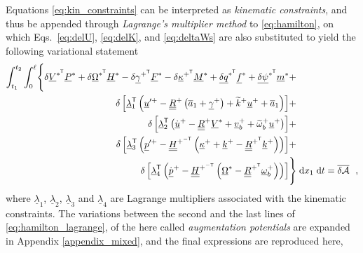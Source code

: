 \documentclass[12pt,a4paper,oneside,english]{abntex2} %
\newcommand{\vect}[1]{\underline{#1}}
\newcommand{\uvec}[1]{\overline{#1}}
\def\tens#1{\underline{\underline{#1}}}
\def\til#1{\widetilde{#1}}
\def\lb{\left[}
\def\rb{\right]}
\def\lp{\left(}
\def\rp{\right)}
\def\T{\mathsf{T}}
\def\A{\mathcal{A}}
\def\xo{x_1}
\def\aone{\uvec{a}_1}
\def\R{\tens{R}}
\def\Rp{\R^+}
\def\RpT{\R^{+^\T}}
\def\u{\vect{u}}
\def\uplus{\u^{+}}
\def\updot{\dot{\u}^{+}}
\def\upprime{\u^{\prime+}}
\def\vb{\vect{v}_b}
\def\vbplus{\vb^{+}}
\def\om{\vect{\omega}_b}
\def\omp{\om^{+}}
\def\omtil{\til{\omega}_b}
\def\omtilp{\omtil^{+}}
\def\gam{\vect{\gamma}}
\def\gamp{\gam^{+}}
\def\gampT{\gam^{+^\T}}
\def\kap{\vect{\kappa}}
\def\kapp{\kap^{+}}
\def\kappT{\kap^{+^\T}}
\def\k{\vect{k}}
\def\kp{\k^{+}}
\def\ktil{\til{k}}
\def\ktilp{\ktil^{+}}
\def\V{\vect{V}}
\def\Vs{\V^{*}}
\def\VsT{\V^{*^\T}}
\def\Om{\vect{\Omega}}
\def\Oms{\Om^{*}}
\def\OmsT{\Om^{*^\T}}
\def\P{\vect{P}}
\def\Ps{\P^*}
\def\Hv{\vect{H}}
\def\Hvs{\Hv^*}
\def\H{\tens{H}}
\def\HpmT{\H^{+^{-\T}}}
\def\p{\vect{p}}
\def\pdot{\dot{\p}}
\def\ppdot{\pdot^{+}}
\def\ppprime{\p^{\prime{+}}}
\def\F{\vect{F}}
\def\Fs{\F^*}
\def\M{\vect{M}}
\def\Ms{\M^*}
\def\f{\vect{f}}
\def\fs{\f^*}
\def\m{\vect{m}}
\def\ms{\m^*}
\def\delq{\vect{\delta q}}
\def\delqsT{\delq^{*^\T}}
\def\delpsi{\vect{\delta\psi}}
\def\delpsisT{\delpsi^{*^\T}}
\def\lamb{\vect{\lambda}}
\def\intt{\int_{t_1}^{t_2}}
\def\intl{\int_{0}^{\ell}}
\def\d{\textnormal{d}}
\begin{document}
Equations \eqref{eq:kin_constraints} can be interpreted as \textit{kinematic constraints}, and thus be appended through \textit{Lagrange's multiplier method} \cite{bauchau2011flexible} to \cref{eq:hamilton}, on which Eqs.~\eqref{eq:delU}, \eqref{eq:delK}, and \eqref{eq:deltaWs} are also substituted to yield the following variational statement
\begin{align}
    \intt\intl \Biggl\{\Biggr. \delta\VsT\Ps + \delta\OmsT\Hvs - \delta\gampT\Fs - \delta\kappT\Ms + \delqsT\fs + \delpsisT\ms &+ \nonumber \\ \delta\lb\lamb_1^\T\lp\upprime-\Rp\lp\aone+\gamp\rp+\ktilp\uplus+\aone\rp\rb &+ \nonumber 
    \\
    \delta\lb\lamb_2^\T\lp\updot-\Rp\Vs+\vbplus+\omtilp\uplus\rp\rb &+  \nonumber \\
    \delta\lb\lamb_3^\T\lp\ppprime-\HpmT\lp\kapp+\kp-\RpT\kp\rp\rp\rb &+  \nonumber 
    \\
    \delta\lb\lamb_4^\T\lp\ppdot-\HpmT\lp\Oms-\RpT\omp\rp\rp\rb &\Biggl.\Biggr\} \;\d \xo\;\d t = \overline{\delta\A} \ \ ,
    \label{eq:hamilton_lagrange}
\end{align}
where $\lamb_1$, $\lamb_2$, $\lamb_3$ and $\lamb_4$ are Lagrange multipliers associated with the kinematic constraints. The variations between the second and the last lines of \cref{eq:hamilton_lagrange}, of the here called \textit{augmentation potentials} are expanded in Appendix \ref{appendix_mixed}, and the final expressions are reproduced here,
\end{document}
